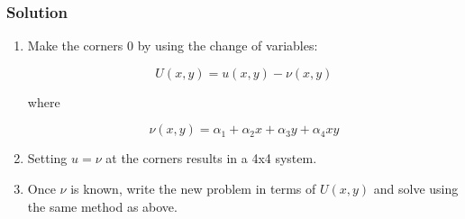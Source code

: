 \documentclass[11pt]{article}
\begin{document}
\subsubsection*{Solution}
\begin{enumerate}

\item Make the corners 0 by using the change of variables:

$$ U(x,y) = u(x,y) - \nu(x,y) $$

where

$$ \nu(x,y) = \alpha_1 +\alpha_2x + \alpha_3y + \alpha_4xy $$

\item Setting $u=\nu$ at the corners results in a 4x4 system.

\item Once $\nu$ is known, write the new problem in terms of $U(x,y)$ and solve using the same method as above.

\end{enumerate}
\end{document}
